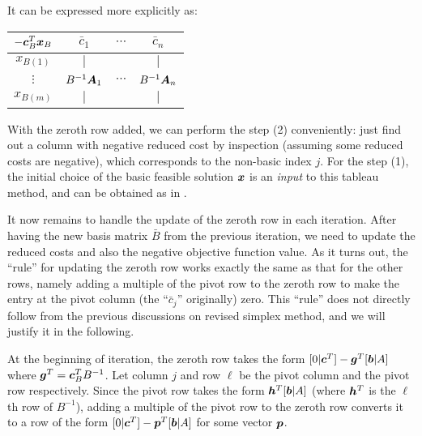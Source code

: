 \begin{enumerate}
It can be expressed more explicitly as:
\begin{center}
\begin{tabular}{cccc}
\toprule
\(-\bm{c}_{B}^{T}\bm{x}_{B}\)&\(\bar{c}_1\)&\(\cdots\)&\(\bar{c}_{n}\) \\
\midrule
\(x_{B(1)}\)&\(\vert\)&&\(\vert\) \\
\(\vdots\)&\(B^{-1}\bm{A}_1\)&\(\cdots\)&\(B^{-1}\bm{A}_n\) \\
\(x_{B(m)}\)&\(\vert\)&&\(\vert\) \\
\bottomrule
\end{tabular}
\end{center}
With the zeroth row added, we can perform the step (2) conveniently: just find
out a column with negative reduced cost by inspection (assuming some reduced
costs are negative), which corresponds to the non-basic index \(j\). For the
step (1), the initial choice of the basic feasible solution \(\bm{x}\) is an
\emph{input} to this tableau method, and can be obtained as in
.

It now remains to handle the update of the zeroth row in each iteration. After
having the new basis matrix \(\bar{B}\) from the previous iteration, we need to
update the reduced costs and also the negative objective function value. As it
turns out, the ``rule'' for updating the zeroth row works exactly the same as
that for the other rows, namely adding a multiple of the pivot row to the
zeroth row to make the entry at the pivot column (the ``\(\bar{c}_j\)''
originally) zero. This ``rule'' does not directly follow from the previous
discussions on revised simplex method, and we will justify it in the following.

\begin{pf}
At the beginning of iteration, the zeroth row takes the form
\([0|\bm{c}^{T}]-\bm{g}^{T}[\bm{b}|A]\) where
\(\bm{g}^{T}=\bm{c}_{B}^{T}B^{-1}\). Let column \(j\) and row \(\ell\) be
the pivot column and the pivot row respectively. Since the pivot row takes the
form \(\bm{h}^{T}[\bm{b}|A]\) (where \(\bm{h}^{T}\) is the \(\ell\)th row
of \(B^{-1}\)), adding a multiple of the pivot row to the zeroth row converts
it to a row of the form \([0|\bm{c}^{T}]-\bm{p}^{T}[\bm{b}|A]\) for some
vector \(\bm{p}\).


\end{pf}
\end{enumerate}
